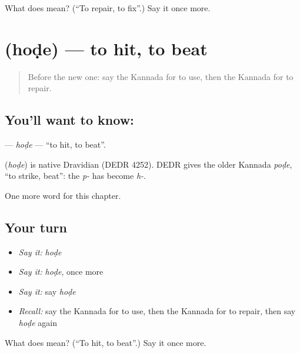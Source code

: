 \begin{tcolorbox}[breakable,colback=teal!4,colframe=teal!35!black,title={Before you move on}]
What does  mean? (\textquotedblleft{}To repair, to fix\textquotedblright{}.) Say it once more.
\end{tcolorbox}
\section[\texorpdfstring{\kn{ಹೊಡೆ} (hoḍe)}{ಹೊಡೆ (hoḍe)}]{ (hoḍe) — to hit, to beat}

\label{lesson:KA-C237-hode}



\begin{quote}
Before the new one: say the Kannada for to use, then the Kannada for to repair.
\end{quote}

\subsection*{You'll want to know: }
\textbf{} — \emph{hoḍe} — \textquotedblleft{}to hit, to beat\textquotedblright{}.

\begin{cousinweb}
\textbf{} (\emph{hoḍe}) is native Dravidian (DEDR 4252). DEDR gives the older Kannada \emph{poḍe}, \textquotedblleft{}to strike, beat\textquotedblright{}: the \emph{p-} has become \emph{h-}.
\end{cousinweb}

\begin{grammarlens}[title={What you've built}]
One more word for this chapter.
\end{grammarlens}

\subsection*{Your turn}
\begin{itemize}
\raggedright
  \item \emph{Say it:} \emph{hoḍe}
  \item \emph{Say it:} \emph{hoḍe}, once more
  \item \emph{Say it:} say \emph{hoḍe}
  \item \emph{Recall:} say the Kannada for to use, then the Kannada for to repair, then say \emph{hoḍe} again
\end{itemize}

\begin{tcolorbox}[breakable,colback=teal!4,colframe=teal!35!black,title={Before you move on}]
What does  mean? (\textquotedblleft{}To hit, to beat\textquotedblright{}.) Say it once more.
\end{tcolorbox}

